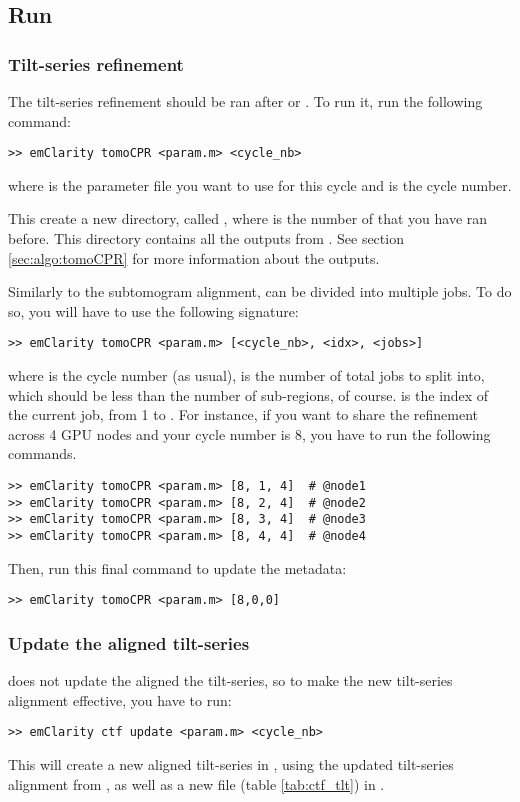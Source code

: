 

\subsection{Run}

\subsubsection{Tilt-series refinement}
The tilt-series refinement should be ran after  or .
To run it, run the following command:
\begin{lstlisting}
>> emClarity tomoCPR <param.m> <cycle_nb>
\end{lstlisting}
where  is the parameter file you want to use for this cycle and  is the cycle number.

This create a new directory, called , where  is the number of  that you have ran before. This directory contains all the outputs from {\tiltalign}. See section \ref{sec:algo:tomoCPR} for more information about the outputs.

Similarly to the subtomogram alignment,  can be divided into multiple jobs. To do so, you will have to use the following signature:
\begin{lstlisting}
>> emClarity tomoCPR <param.m> [<cycle_nb>, <idx>, <jobs>]
\end{lstlisting}
where  is the cycle number (as usual),  is the number of total jobs to split into, which should be less than the number of sub-regions, of course.  is the index of the current job, from 1 to . For instance, if you want to share the refinement across 4 GPU nodes and your cycle number is 8, you have to run the following commands.
\begin{lstlisting}
>> emClarity tomoCPR <param.m> [8, 1, 4]  # @node1
>> emClarity tomoCPR <param.m> [8, 2, 4]  # @node2
>> emClarity tomoCPR <param.m> [8, 3, 4]  # @node3
>> emClarity tomoCPR <param.m> [8, 4, 4]  # @node4
\end{lstlisting}
Then, run this final command to update the metadata:
\begin{lstlisting}
>> emClarity tomoCPR <param.m> [8,0,0]
\end{lstlisting}


\subsubsection{Update the aligned tilt-series}
 does not update the aligned the tilt-series, so to make the new tilt-series alignment effective, you have to run:
\begin{lstlisting}
>> emClarity ctf update <param.m> <cycle_nb>
\end{lstlisting}

This will create a new aligned tilt-series in , using the updated tilt-series alignment from , as well as a new  file (table \ref{tab:ctf_tlt}) in .